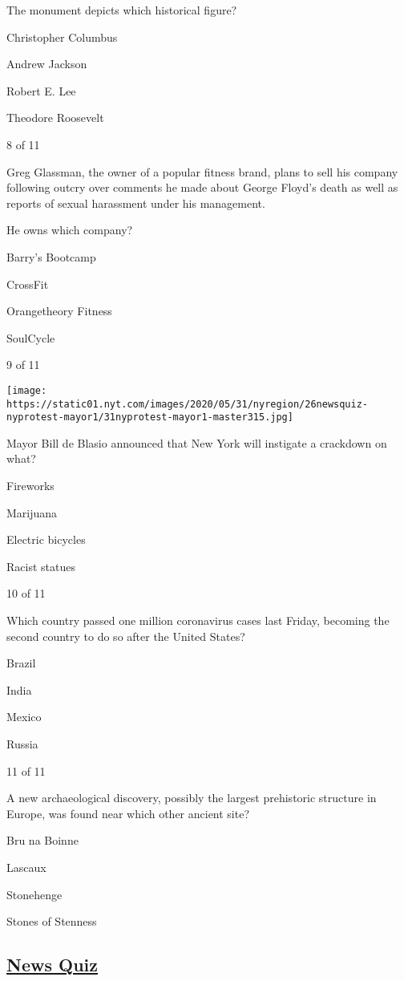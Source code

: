 The monument depicts which historical figure?

Christopher Columbus

Andrew Jackson

Robert E. Lee

Theodore Roosevelt

8 of 11

Greg Glassman, the owner of a popular fitness brand, plans to sell his
company following outcry over comments he made about George Floyd's
death as well as reports of sexual harassment under his management.

He owns which company?

Barry's Bootcamp

CrossFit

Orangetheory Fitness

SoulCycle

9 of 11

\texttt{[image: https://static01.nyt.com/images/2020/05/31/nyregion/26newsquiz-nyprotest-mayor1/31nyprotest-mayor1-master315.jpg]}

Mayor Bill de Blasio announced that New York will instigate a crackdown
on what?

Fireworks

Marijuana

Electric bicycles

Racist statues

10 of 11

Which country passed one million coronavirus cases last Friday, becoming
the second country to do so after the United States?

Brazil

India

Mexico

Russia

11 of 11

A new archaeological discovery, possibly the largest prehistoric
structure in Europe, was found near which other ancient site?

Bru na Boinne

Lascaux

Stonehenge

Stones of Stenness

\hypertarget{news-quiz}{%
\subsection{\texorpdfstring{\href{https://www.nytimes.com/spotlight/news-quiz}{News
Quiz}}{News Quiz}}\label{news-quiz}}

